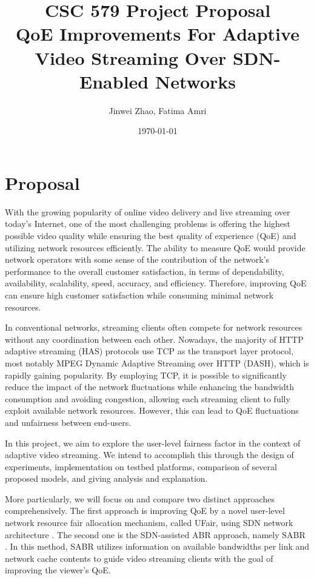 \documentclass{article}
\begin{document}
\title{\textbf{CSC 579 Project Proposal \protect\\ QoE Improvements For Adaptive Video Streaming Over SDN-Enabled Networks}}

\author{Jinwei Zhao, Fatima Amri}

\date{\today}

\maketitle

\section{Proposal}

With the growing popularity of online video delivery and live streaming over today's Internet, one of the most challenging problems is offering the highest possible video quality while ensuring the best quality of experience (QoE) and utilizing network resources efficiently. The ability to measure QoE would provide network operators with some sense of the contribution of the network's performance to the overall customer satisfaction, in terms of dependability, availability, scalability, speed, accuracy, and efficiency. Therefore, improving QoE can ensure high customer satisfaction while consuming minimal network resources.

In conventional networks, streaming clients often compete for network resources without any coordination between each other. Nowadays, the majority of HTTP adaptive streaming (HAS) protocols use TCP as the transport layer protocol, most notably MPEG Dynamic Adaptive Streaming over HTTP (DASH), which is rapidly gaining popularity. By employing TCP, it is possible to significantly reduce the impact of the network fluctuations while enhancing the bandwidth consumption and avoiding congestion, allowing each streaming client to fully exploit available network resources. However, this can lead to QoE fluctuations and unfairness between end-users.

In this project, we aim to explore the user-level fairness factor in the context of adaptive video streaming. We intend to accomplish this through the design of experiments, implementation on testbed platforms, comparison of several proposed models, and giving analysis and explanation.

More particularly, we will focus on and compare two distinct approaches comprehensively. The first approach is improving QoE by a novel user-level network resource fair allocation mechanism, called UFair, using SDN network architecture \cite{mu_scalable_2016}. The second one is the SDN-assisted ABR approach, namely SABR \cite{bhat_network_2017}. In this method, SABR utilizes information on available bandwidths per link and network cache contents to guide video streaming clients with the goal of improving the viewer's QoE.
\end{document}
